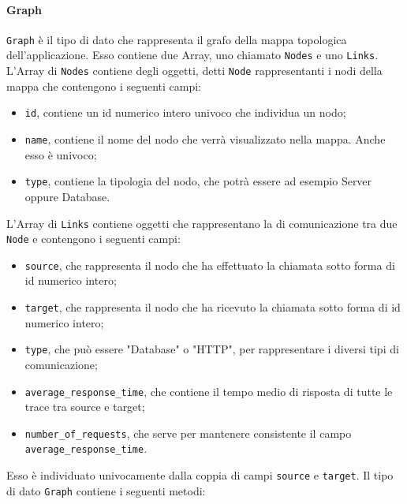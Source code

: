 \paragraph{Graph}
\label{sec:Graph}
	\texttt{Graph} è il tipo di dato che rappresenta il grafo della mappa topologica dell'applicazione. Esso contiene due Array, uno chiamato \texttt{Nodes} e uno \texttt{Links}.
	\label{sec:Nodes}
	L'Array di \texttt{Nodes} contiene degli oggetti, detti \texttt{Node} rappresentanti i nodi della mappa che contengono i seguenti campi:
	\begin{itemize}
		\item \texttt{id}, contiene un id numerico intero univoco che individua un nodo;
		\item \texttt{name}, contiene il nome del nodo che verrà visualizzato nella mappa. Anche esso è univoco;
		\item \texttt{type}, contiene la tipologia del nodo, che potrà essere ad esempio Server oppure Database.
	\end{itemize}
	\label{sec:Links}
	L'Array di \texttt{Links} contiene oggetti che rappresentano la di comunicazione tra due \texttt{Node} e contengono i seguenti campi:
	\begin{itemize}
		\item{\texttt{source}, che rappresenta il nodo che ha effettuato la chiamata sotto forma di id numerico intero;}
		\item{\texttt{target}, che rappresenta il nodo che ha ricevuto la chiamata sotto forma di id numerico intero;}
		\item{\texttt{type}, che può essere "Database" o "HTTP", per rappresentare i diversi tipi di comunicazione;}
		\item{\texttt{average\_response\_time}, che contiene il tempo medio di risposta di tutte le trace tra source e target;}
		\item{\texttt{number\_of\_requests}, che serve per mantenere consistente il campo \texttt{average\_response\_time}.}
	\end{itemize}
	Esso è individuato univocamente dalla coppia di campi \texttt{source} e \texttt{target}.
	Il tipo di dato \texttt{Graph} contiene i seguenti metodi:
